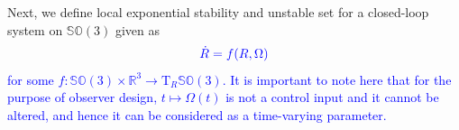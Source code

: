 \documentclass{article}
\newcommand{\SOthree}{\mathbb{SO}(3)}
\newcommand{\R}[1]{\mathbb{R}^{#1}}
\newtheorem{definition}{Definition}
\newcommand{\textblue}[1]{\textcolor{blue}{#1}}
\newcommand{\Rtilde}{\tilde{R}}
\newcommand{\normSOthree}[1]{{{\vert}#1 {\vert}_I}}
\newcommand{\expo}[1]{e^{#1}}
\newcommand{\T}[2]{\text{T}_{#1}{#2}}
\begin{document}
Next, we define local exponential stability and {unstable set} for a closed-loop system on $\SOthree$ given as
\begin{align}\label{eq:CL-rotm}
    \textblue{\dot{R} = f(R, \Omega)}
\end{align}
\textblue{for some $f:\SOthree\times \R{3}\to \T{R}{\SOthree}$. It is important to note here that for the purpose of observer design, $t\mapsto \Omega(t)$ is not a control input and it cannot be altered, and hence it can be considered as a time-varying parameter. }

\end{document}
